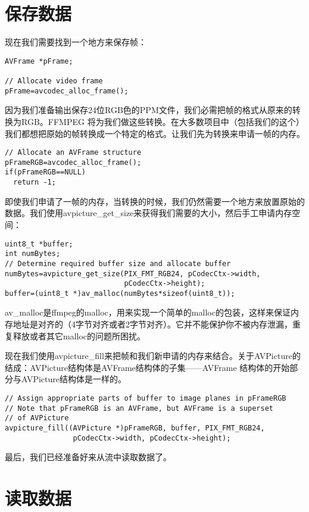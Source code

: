 \section{保存数据}

现在我们需要找到一个地方来保存帧：
\begin{lstlisting}
AVFrame *pFrame;

// Allocate video frame
pFrame=avcodec_alloc_frame();
\end{lstlisting}

因为我们准备输出保存24位RGB色的PPM文件，我们必需把帧的格式从原来的转换为RGB。FFMPEG 将为我们做这些转换。在大多数项目中（包括我们的这个）我们都想把原始的帧转换成一个特定的格式。让我们先为转换来申请一帧的内存。
\begin{lstlisting}
// Allocate an AVFrame structure
pFrameRGB=avcodec_alloc_frame();
if(pFrameRGB==NULL)
  return -1;
\end{lstlisting}

即使我们申请了一帧的内存，当转换的时候，我们仍然需要一个地方来放置原始的数据。我们使用avpicture_get_size来获得我们需要的大小，然后手工申请内存空间：

\begin{lstlisting}
uint8_t *buffer;
int numBytes;
// Determine required buffer size and allocate buffer
numBytes=avpicture_get_size(PIX_FMT_RGB24, pCodecCtx->width,
                            pCodecCtx->height);
buffer=(uint8_t *)av_malloc(numBytes*sizeof(uint8_t));
\end{lstlisting}

av_malloc是ffmpeg的malloc，用来实现一个简单的malloc的包装，这样来保证内存地址是对齐的（4字节对齐或者2字节对齐）。它并不能保护你不被内存泄漏，重复释放或者其它malloc的问题所困扰。

现在我们使用avpicture_fill来把帧和我们新申请的内存来结合。关于AVPicture的结成：AVPicture结构体是AVFrame结构体的子集——AVFrame 结构体的开始部分与AVPicture结构体是一样的。

\begin{lstlisting}
// Assign appropriate parts of buffer to image planes in pFrameRGB
// Note that pFrameRGB is an AVFrame, but AVFrame is a superset
// of AVPicture
avpicture_fill((AVPicture *)pFrameRGB, buffer, PIX_FMT_RGB24,
                pCodecCtx->width, pCodecCtx->height);
\end{lstlisting}

最后，我们已经准备好来从流中读取数据了。

\section{读取数据}

